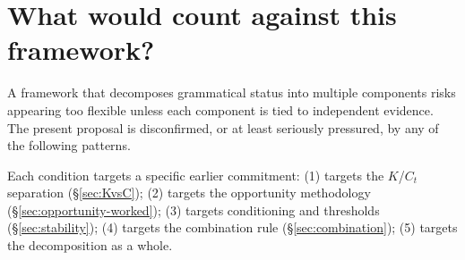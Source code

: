 \documentclass[12pt,letterpaper]{article}
\begin{document}
\section{What would count against this framework?}\label{sec:falsify}

A framework that decomposes grammatical status into multiple components risks appearing too flexible unless each component is tied to independent evidence. The present proposal is disconfirmed, or at least seriously pressured, by any of the following patterns.

Each condition targets a specific earlier commitment: (1) targets the $K$/$C_t$ separation (\S\ref{sec:KvsC}); (2) targets the opportunity methodology (\S\ref{sec:opportunity-worked}); (3) targets conditioning and thresholds (\S\ref{sec:stability}); (4) targets the combination rule (\S\ref{sec:combination}); (5) targets the decomposition as a whole.
\end{document}
